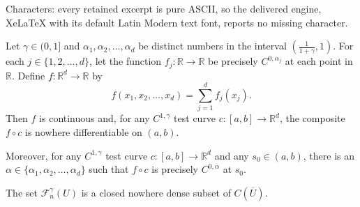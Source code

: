 \documentclass[10pt,a4paper]{amsart}
\newcommand{\R}{{\mathbb R}}		%
\newcommand{\adj}{{precisely }} %
\newcommand{\cn}{\colon}                %
\begin{document}
Characters: every retained excerpt is pure ASCII, so the delivered engine, XeLaTeX with its default Latin Modern text font, reports no missing character.
\begin{thm}\label{thm:main_example}
  Let $\gamma\in(0,1]$ and 
  $\alpha_1, \alpha_2 ,\ldots, \alpha_d$ be distinct 
  numbers in the interval $(\tfrac{1}{1+\gamma},1)$.
  For each
  $j \in \{1,2, \ldots, d\}$, let the function 
  $f_j\cn\R\to\R$ be  \adj $C^{0,\alpha_j}$
  at each point in $\R$. 
Define  $f\cn \R^d \to \R$ by 
$$
f(x_1, x_2 ,\ldots,x_d) = \sum_{j=1}^d f_j(x_j). 
$$
Then $f$ is continuous and, 
for any $C^{1,\gamma}$ test curve $c: [a,b]\to\R^d$,
the composite $f\circ c$ is nowhere differentiable on $(a,b)$.


Moreover,
for any $C^{1,\gamma}$ test curve $c\cn [a,b]\to \R^d$
and any $s_0\in (a,b)$, there
is an $\alpha \in \{ \alpha_1, \alpha_2 ,\ldots, \alpha_d\}$ such
that $f\circ c $ is \adj $C^{0,\alpha}$ at $s_0$. 
\end{thm}

\begin{lemma}\label{lem:not_dense}
  The set $\mathcal F_n^\gamma (U)$ is a closed nowhere dense
  subset of $C(\overline U)$.
\end{lemma}
\end{document}
